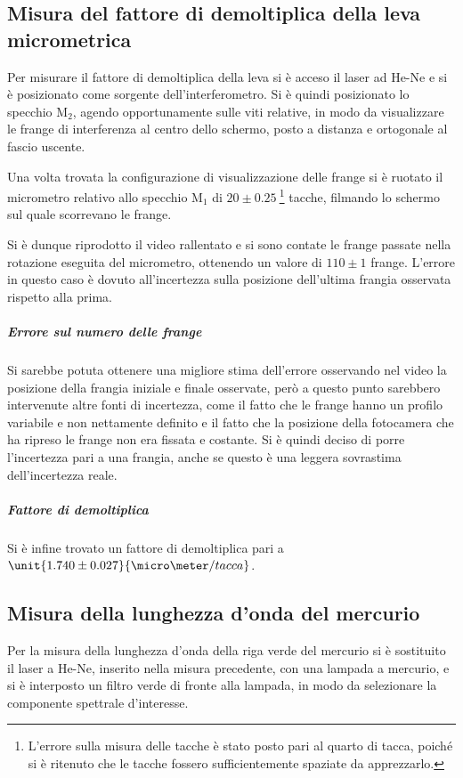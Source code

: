 \documentclass[a4paper,10pt]{article}
\begin{document}
{{{{\subsection{Misura del fattore di demoltiplica della leva micrometrica}
Per misurare il fattore di demoltiplica della leva si è acceso il laser ad He-Ne e si è posizionato come sorgente dell'interferometro.
Si è quindi posizionato lo specchio M$_2$, agendo opportunamente sulle viti relative, in modo da visualizzare le frange di interferenza al centro dello schermo, posto a distanza e ortogonale al fascio uscente.

Una volta trovata la configurazione di visualizzazione delle frange si è ruotato il micrometro relativo allo specchio M$_1$ di $20 \pm 0.25~$\footnote{L'errore sulla misura delle tacche è stato posto pari al quarto di tacca, poiché si è ritenuto che le tacche fossero sufficientemente spaziate da apprezzarlo.} tacche, filmando lo schermo sul quale scorrevano le frange.

Si è dunque riprodotto il video rallentato e si sono contate le frange passate nella rotazione eseguita del micrometro, ottenendo un valore di $110 \pm 1$ frange. L'errore in questo caso è dovuto all'incertezza sulla posizione dell'ultima frangia osservata rispetto alla prima.

\subparagraph{Errore sul numero delle frange} Si sarebbe potuta ottenere una migliore stima dell'errore osservando nel video la posizione della frangia iniziale e finale osservate, però a questo punto sarebbero intervenute altre fonti di incertezza, come il fatto che le frange hanno un profilo variabile e non nettamente definito e il fatto che la posizione della fotocamera che ha ripreso le frange non era fissata e costante. Si è quindi deciso di porre l'incertezza pari a una frangia, anche se questo è una leggera sovrastima dell'incertezza reale.

\subparagraph{Fattore di demoltiplica} Si è infine trovato un fattore di demoltiplica pari a $\unit{1.740 \pm 0.027}{\micro\meter / tacca}$.

\subsection{Misura della lunghezza d'onda del mercurio}
Per la misura della lunghezza d'onda della riga verde del mercurio si è sostituito il laser a He-Ne, inserito nella misura precedente, con una lampada a mercurio, e si è interposto un filtro verde di fronte alla lampada, in modo da selezionare la componente spettrale d'interesse.

}}}}
\end{document}
